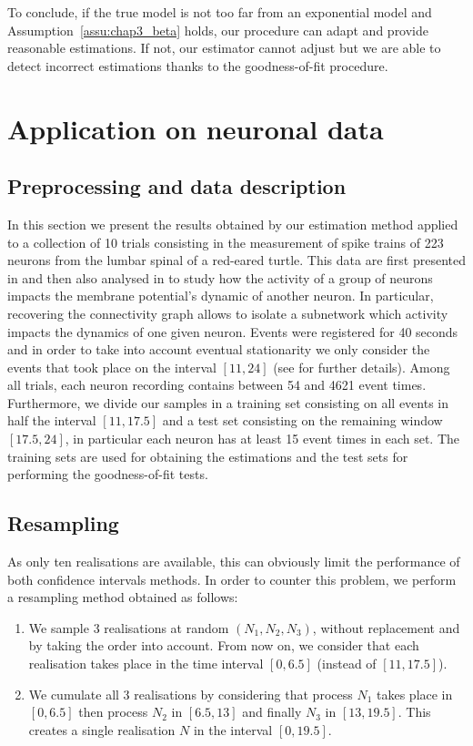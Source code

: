 To conclude, if the true model is not too far from an exponential model and Assumption~\ref{assu:chap3_beta} holds, our procedure can adapt and provide reasonable estimations. If not, our estimator cannot adjust but we are able to detect incorrect estimations thanks to the goodness-of-fit procedure.


\section{Application on neuronal data}\label{sec:chap3_neuron}

\subsection{Preprocessing and data description}

In this section we present the results obtained by our estimation method applied to a collection of 10 trials consisting in the measurement of spike trains of 223 neurons from the lumbar spinal of a red-eared turtle. This data are first presented in  \textcite{Petersen2016} and then also analysed in \textcite{Bonnet2022bis} to study how the activity of a group of neurons impacts the membrane potential's dynamic of another neuron. In particular, recovering the connectivity graph allows to isolate a subnetwork which activity impacts the dynamics of one given neuron.  Events were registered for 40 seconds and in order to take into account eventual stationarity we only consider the events that took place on the interval $[11, 24]$ (see \textcite{Bonnet2022bis} for further details).  Among all trials, each neuron recording contains between 54 and 4621 event times. Furthermore, we divide our samples in a training set consisting on all events in half the interval $[11, 17.5]$ and a test set consisting on the remaining window $[17.5, 24]$, in particular each neuron has at least 15 event times in each set. The training sets are used for obtaining the estimations and the test sets for performing the goodness-of-fit tests. 

\subsection{Resampling}

As only ten realisations are available, this can obviously limit the performance of both confidence intervals methods. In order to counter this problem, we perform a resampling method obtained as follows:
\begin{enumerate}
	\item We sample 3 realisations at random $(N_1, N_2, N_3)$, without replacement and by taking the order into account. From now on, we consider that each realisation takes place in the time interval $[0,6.5]$ (instead of $[11, 17.5]$).
	\item We cumulate all 3 realisations by considering that process $N_1$ takes place in $[0, 6.5]$ then process $N_2$ in $[6.5, 13]$ and finally $N_3$ in $[13, 19.5]$. This creates a single realisation $N$ in the interval $[0, 19.5]$. 
\end{enumerate}


